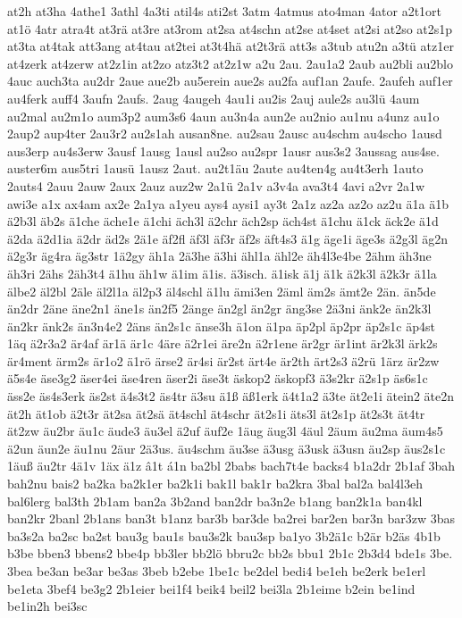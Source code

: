 {at2h
at3ha
4athe1
3athl
4a3ti
atil4s
ati2st
3atm
4atmus
ato4man
4ator
a2t1ort
at1ö
4atr
atra4t
at3rä
at3re
at3rom
at2sa
at4schn
at2se
at4set
at2si
at2so
at2s1p
at3ta
at4tak
att3ang
at4tau
at2tei
at3t4hä
at2t3rä
att3s
a3tub
atu2n
a3tü
atz1er
at4zerk
at4zerw
at2z1in
at2zo
atz3t2
at2z1w
a2u
2au.
2au1a2
2aub
au2bli
au2blo
4auc
auch3ta
au2dr
2aue
aue2b
au5erein
aue2s
au2fa
auf1an
2aufe.
2aufeh
auf1er
au4ferk
auff4
3aufn
2aufs.
2aug
4augeh
4au1i
au2is
2auj
aule2s
au3lü
4aum
au2mal
au2m1o
aum3p2
aum3s6
4aun
au3n4a
aun2e
au2nio
au1nu
a4unz
au1o
2aup2
aup4ter
2au3r2
au2s1ah
ausan8ne.
au2sau
2ausc
au4schm
au4scho
1ausd
aus3erp
au4s3erw
3ausf
1ausg
1ausl
au2so
au2spr
1ausr
aus3s2
3aussag
aus4se.
auster6m
aus5tri
1ausü
1ausz
2aut.
au2t1äu
2aute
au4ten4g
au4t3erh
1auto
2auts4
2auu
2auw
2aux
2auz
auz2w
2a1ü
2a1v
a3v4a
ava3t4
4avi
a2vr
2a1w
awi3e
a1x
ax4am
ax2e
2a1ya
a1yeu
ays4
aysi1
ay3t
2a1z
az2a
az2o
az2u
ä1a
ä1b
ä2b3l
äb2s
ä1che
äche1e
ä1chi
äch3l
ä2chr
äch2sp
äch4st
ä1chu
ä1ck
äck2e
ä1d
ä2da
ä2d1ia
ä2dr
äd2s
2ä1e
äf2fl
äf3l
äf3r
äf2s
äft4s3
ä1g
äge1i
äge3s
ä2g3l
äg2n
ä2g3r
äg4ra
äg3str
1ä2gy
äh1a
2ä3he
ä3hi
ähl1a
ähl2e
äh4l3e4be
2ähm
äh3ne
äh3ri
2ähs
2äh3t4
ä1hu
äh1w
ä1im
ä1is.
ä3isch.
ä1isk
ä1j
ä1k
ä2k3l
ä2k3r
ä1la
älbe2
äl2bl
2äle
äl2l1a
äl2p3
äl4schl
ä1lu
ämi3en
2äml
äm2s
ämt2e
2än.
än5de
än2dr
2äne
äne2n1
äne1s
än2f5
2änge
än2gl
än2gr
äng3se
2ä3ni
änk2e
än2k3l
än2kr
änk2s
än3n4e2
2äns
än2s1c
änse3h
ä1on
ä1pa
äp2pl
äp2pr
äp2s1c
äp4st
1äq
ä2r3a2
är4af
är1ä
är1c
4äre
ä2r1ei
äre2n
ä2r1ene
är2gr
är1int
är2k3l
ärk2s
är4ment
ärm2s
är1o2
ä1rö
ärse2
är4si
är2st
ärt4e
är2th
ärt2s3
ä2rü
1ärz
är2zw
ä5s4e
äse3g2
äser4ei
äse4ren
äser2i
äse3t
äskop2
äskopf3
ä3s2kr
ä2s1p
äs6s1c
äss2e
äs4s3erk
äs2st
ä4s3t2
äs4tr
ä3su
ä1ß
äß1erk
ä4t1a2
ä3te
ät2e1i
ätein2
äte2n
ät2h
ät1ob
ä2t3r
ät2sa
ät2sä
ät4schl
ät4schr
ät2s1i
äts3l
ät2s1p
ät2s3t
ät4tr
ät2zw
äu2br
äu1c
äude3
äu3el
ä2uf
äuf2e
1äug
äug3l
4äul
2äum
äu2ma
äum4s5
ä2un
äun2e
äu1nu
2äur
2ä3us.
äu4schm
äu3se
ä3usg
ä3usk
ä3usn
äu2sp
äus2s1c
1äuß
äu2tr
4ä1v
1äx
ä1z
â1t
á1n
ba2bl
2babs
bach7t4e
backs4
b1a2dr
2b1af
3bah
bah2nu
bais2
ba2ka
ba2k1er
ba2k1i
bak1l
bak1r
ba2kra
3bal
bal2a
bal4l3eh
bal6lerg
bal3th
2b1am
ban2a
3b2and
ban2dr
ba3n2e
b1ang
ban2k1a
ban4kl
ban2kr
2banl
2b1ans
ban3t
b1anz
bar3b
bar3de
ba2rei
bar2en
bar3n
bar3zw
3bas
ba3s2a
ba2sc
ba2st
bau3g
bau1s
bau3s2k
bau3sp
ba1yo
3b2ä1c
b2är
b2äs
4b1b
b3be
bben3
bbens2
bbe4p
bb3ler
bb2lö
bbru2c
bb2s
bbu1
2b1c
2b3d4
bde1s
3be.
3bea
be3an
be3ar
be3as
3beb
b2ebe
1be1c
be2del
bedi4
be1eh
be2erk
be1erl
be1eta
3bef4
be3g2
2b1eier
bei1f4
beik4
beil2
bei3la
2b1eime
b2ein
be1ind
be1in2h
bei3sc
}
